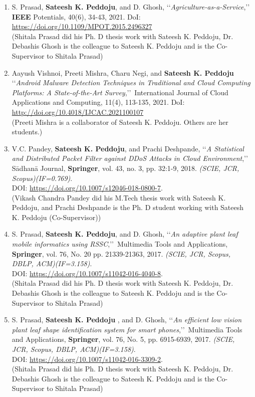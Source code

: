 \begin{enumerate}
	\item
	S. Prasad, \textbf{Sateesh K. Peddoju}, and D. Ghosh, \lq\lq \textit{Agriculture-as-a-Service},\rq\rq\, {\textbf{IEEE} Potentials}, 40(6), 34-43, 2021. DoI: \url{https://doi.org/10.1109/MPOT.2015.2496327}  \\(Shitala Prasad did his Ph. D thesis work with Sateesh K. Peddoju, Dr. Debashis Ghosh is the colleague to Sateesh K. Peddoju and is the Co-Supervisor to Shitala Prasad)

 	\item
	Aayush Vishnoi, Preeti Mishra, Charu Negi, and \textbf{Sateesh K. Peddoju} \lq\lq \textit{Android Malware Detection Techniques in Traditional and Cloud Computing Platforms: A State-of-the-Art Survey},\rq\rq\, {International Journal of Cloud Applications and Computing}, 11(4), 113-135, 2021. DoI: \url{http://doi.org/10.4018/IJCAC.2021100107}  \\(Preeti Mishra is a collaborator of Sateesh K. Peddoju. Others are her students.)
 
	\item
	V.C. Pandey, \textbf{Sateesh K. Peddoju}, and Prachi Deshpande, \lq\lq \textit{A Statistical and Distributed Packet Filter against DDoS Attacks in Cloud Environment},\rq\rq\, S{\={a}}dhan{\={a}} Journal, \textbf{Springer}, vol. 43, no. 3, pp. 32:1-9, 2018. \emph{(SCIE, JCR, Scopus)(IF=0.769)}. \\DOI: \url{https://doi.org/10.1007/s12046-018-0800-7}.  \\(Vikash Chandra Pandey did his M.Tech thesis work with Sateesh K. Peddoju, and Prachi Deshpande is the Ph. D student working with Sateesh K. Peddoju (Co-Supervisor))
	
	\item
	S. Prasad, \textbf{Sateesh K. Peddoju}, and D. Ghosh, \lq\lq \textit{An adaptive plant leaf mobile informatics using RSSC},\rq\rq\, Multimedia Tools and Applications, \textbf{Springer}, vol. 76, No. 20 pp. 21339-21363, 2017. \emph{(SCIE, JCR, Scopus, DBLP, ACM)(IF=3.158)}. \\DOI: \url{https://doi.org/10.1007/s11042-016-4040-8}.  \\(Shitala Prasad did his Ph. D thesis work with Sateesh K. Peddoju, Dr. Debashis Ghosh is the colleague to Sateesh K. Peddoju and is the Co-Supervisor to Shitala Prasad)
	
	\item
	S. Prasad, \textbf{Sateesh K. Peddoju} , and D. Ghosh, \lq\lq \textit{An efficient low vision plant leaf shape identification system for smart phones},\rq\rq\, Multimedia Tools and Applications, \textbf{Springer}, vol. 76, No. 5, pp. 6915-6939, 2017. \emph{(SCIE, JCR, Scopus, DBLP, ACM)(IF=3.158)}. \\DOI: \url{https://doi.org/10.1007/s11042-016-3309-2}.  \\(Shitala Prasad did his Ph. D thesis work with Sateesh K. Peddoju, Dr. Debashis Ghosh is the colleague to Sateesh K. Peddoju and is the Co-Supervisor to Shitala Prasad)
	

\end{enumerate}
